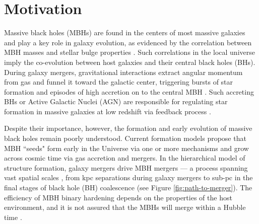 \documentclass[11pt, letterpaper]{article}
\begin{document}

\section{Motivation}

Massive black holes (MBHs) are found in the centers of most massive galaxies \citep{Kormendy_1995,magorrian_demography_1998} and play a key role in galaxy evolution, as evidenced by the correlation between MBH masses and stellar bulge properties \citep{ferrarese_fundamental_2000,gultekin_m-sigma_2009,Kormendy_2013,mcconnell_revisiting_2013}. Such correlations in the local universe imply the co-evolution between host galaxies and their central black holes (BHs). During galaxy mergers, gravitational interactions extract angular momentum from gas and funnel it toward the galactic center, triggering bursts of star formation and episodes of high accretion on to the central MBH \citep{Barnes_and_Hernquist_1992}. Such 
accreting BHs or Active Galactic Nuclei (AGN) are responsible for regulating star formation in massive galaxies at low redshift via feedback process \citep{DiMatteo_2005,Vogelsberg_2014a}. 



Despite their importance, however, the formation and early evolution of massive black holes remain poorly understood. Current formation models propose that MBH ``seeds" form early in the Universe via one or more mechanisms \citep{Madau_2001,Davies2011,Bromm_Loeb_2003} and grow across cosmic time via gas accretion and mergers. In the hierarchical model of structure formation, galaxy mergers drive MBH mergers — a process spanning vast spatial scales \citep{Begelman1980,merritt_massive_2005}, from kpc separations during galaxy mergers to sub-pc in the final stages of black hole (BH) coalescence (see Figure \ref{fig:path-to-merger}). The efficiency of MBH binary hardening depends on the properties of the host environment, and it is not assured that the MBHs will merge within a Hubble time \citep{2003MerritandMilosavljevic}. 
\end{document}
